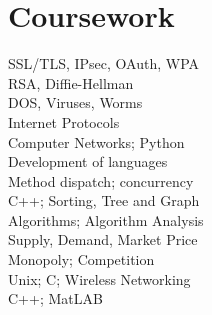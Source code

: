 \documentclass[]{resume}
\begin{document}
\begin{minipage}[t]{0.33\textwidth}
\section{Coursework}
\hspace{8pt} SSL/TLS, IPsec, OAuth, WPA \\
\hspace{8pt} RSA, Diffie-Hellman \\
\hspace{8pt} DOS, Viruses, Worms \\
\vspace{4pt}
\hspace{8pt} Internet Protocols \\
\hspace{8pt} Computer Networks; Python \\
\vspace{4pt}
\hspace{8pt} Development of languages \\
\hspace{8pt} Method dispatch; concurrency \\
\vspace{4pt}
\hspace{8pt} C++; Sorting, Tree and Graph \\
\hspace{8pt} Algorithms; Algorithm Analysis\\
\vspace{4pt}
\hspace{8pt} Supply, Demand, Market Price \\
\hspace{8pt} Monopoly; Competition \\
\vspace{4pt}
\hspace{8pt} Unix; C; Wireless Networking \\
\vspace{4pt}
\hspace{8pt} C++; MatLAB \\
\vspace{4pt}
\sectionsep



\end{minipage}
\end{document}
